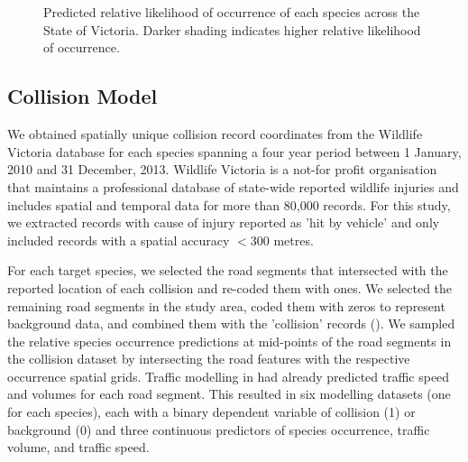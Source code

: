 \begin{figure*}[htp]
  \centering
  \\
  \\  
  \caption[Predicted relative likelihood of six mammal species occurrence in Victoria]{Predicted relative likelihood of occurrence of each species across the State of Victoria. Darker shading indicates higher relative likelihood of occurrence.}
  \label{6sp_occ_preds}
\end{figure*}

\subsection{Collision Model}

We obtained spatially unique collision record coordinates from the Wildlife Victoria database for each species spanning a four year period between 1 January, 2010 and 31 December, 2013. Wildlife Victoria is a not-for profit organisation that maintains a professional database of state-wide reported wildlife injuries and includes spatial and temporal data for more than 80,000 records.  For this study, we extracted records with cause of injury reported as 'hit by vehicle' and only included records with a spatial accuracy $<$300 metres.

For each target species, we selected the road segments that intersected with the reported location of each collision and re-coded them with ones.  We selected the remaining road segments in the study area, coded them with zeros to represent background data, and combined them with the 'collision' records ().  We sampled the relative species occurrence predictions at mid-points of the road segments in the collision dataset by intersecting the road features with the respective occurrence spatial grids.  Traffic modelling in  had already predicted traffic speed and volumes for each road segment.  This resulted in six modelling datasets (one for each species), each with a binary dependent variable of collision (1) or background (0) and three continuous predictors of species occurrence, traffic volume, and traffic speed.

